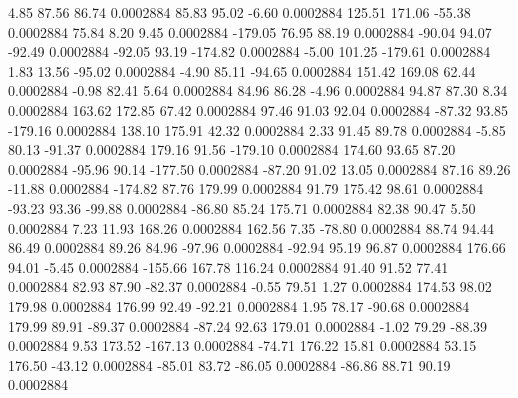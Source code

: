         4.85       87.56       86.74     0.0002884
       85.83       95.02       -6.60     0.0002884
      125.51      171.06      -55.38     0.0002884
       75.84        8.20        9.45     0.0002884
     -179.05       76.95       88.19     0.0002884
      -90.04       94.07      -92.49     0.0002884
      -92.05       93.19     -174.82     0.0002884
       -5.00      101.25     -179.61     0.0002884
        1.83       13.56      -95.02     0.0002884
       -4.90       85.11      -94.65     0.0002884
      151.42      169.08       62.44     0.0002884
       -0.98       82.41        5.64     0.0002884
       84.96       86.28       -4.96     0.0002884
       94.87       87.30        8.34     0.0002884
      163.62      172.85       67.42     0.0002884
       97.46       91.03       92.04     0.0002884
      -87.32       93.85     -179.16     0.0002884
      138.10      175.91       42.32     0.0002884
        2.33       91.45       89.78     0.0002884
       -5.85       80.13      -91.37     0.0002884
      179.16       91.56     -179.10     0.0002884
      174.60       93.65       87.20     0.0002884
      -95.96       90.14     -177.50     0.0002884
      -87.20       91.02       13.05     0.0002884
       87.16       89.26      -11.88     0.0002884
     -174.82       87.76      179.99     0.0002884
       91.79      175.42       98.61     0.0002884
      -93.23       93.36      -99.88     0.0002884
      -86.80       85.24      175.71     0.0002884
       82.38       90.47        5.50     0.0002884
        7.23       11.93      168.26     0.0002884
      162.56        7.35      -78.80     0.0002884
       88.74       94.44       86.49     0.0002884
       89.26       84.96      -97.96     0.0002884
      -92.94       95.19       96.87     0.0002884
      176.66       94.01       -5.45     0.0002884
     -155.66      167.78      116.24     0.0002884
       91.40       91.52       77.41     0.0002884
       82.93       87.90      -82.37     0.0002884
       -0.55       79.51        1.27     0.0002884
      174.53       98.02      179.98     0.0002884
      176.99       92.49      -92.21     0.0002884
        1.95       78.17      -90.68     0.0002884
      179.99       89.91      -89.37     0.0002884
      -87.24       92.63      179.01     0.0002884
       -1.02       79.29      -88.39     0.0002884
        9.53      173.52     -167.13     0.0002884
      -74.71      176.22       15.81     0.0002884
       53.15      176.50      -43.12     0.0002884
      -85.01       83.72      -86.05     0.0002884
      -86.86       88.71       90.19     0.0002884
